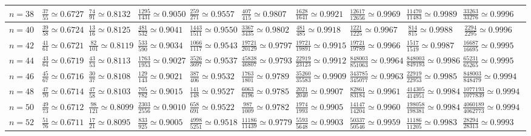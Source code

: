 \begin{landscape}
\begin{table}
\begin{tabular}{|c||c|c|c|c|c|c|c|c|c|c}
$n=38$ & $\frac{37}{55}\simeq0.6727$ & $\frac{74}{91}\simeq0.8132$ & $\frac{1295}{1431}\simeq0.9050$ & $\frac{259}{271}\simeq0.9557$ & $\frac{407}{415}\simeq0.9807$ & $\frac{1628}{1641}\simeq0.9921$ & $\frac{12617}{12656}\simeq0.9969$ & $\frac{11470}{11483}\simeq0.9989$ & $\frac{33263}{33276}\simeq0.9996$ \\ \hline
$n=40$ & $\frac{39}{58}\simeq0.6724$ & $\frac{13}{16}\simeq0.8125$ & $\frac{481}{532}\simeq0.9041$ & $\frac{1443}{1511}\simeq0.9550$ & $\frac{3367}{3435}\simeq0.9802$ & $\frac{481}{485}\simeq0.9918$ & $\frac{1221}{1225}\simeq0.9967$ & $\frac{814}{815}\simeq0.9988$ & $\frac{2294}{2295}\simeq0.9996$ \\ \hline
$n=42$ & $\frac{41}{61}\simeq0.6721$ & $\frac{82}{101}\simeq0.8119$ & $\frac{533}{590}\simeq0.9034$ & $\frac{1066}{1117}\simeq0.9543$ & $\frac{19721}{20129}\simeq0.9797$ & $\frac{19721}{19891}\simeq0.9915$ & $\frac{19721}{19789}\simeq0.9966$ & $\frac{1517}{1519}\simeq0.9987$ & $\frac{16687}{16695}\simeq0.9995$ \\ \hline
$n=44$ & $\frac{43}{64}\simeq0.6719$ & $\frac{43}{53}\simeq0.8113$ & $\frac{1763}{1953}\simeq0.9027$ & $\frac{3526}{3697}\simeq0.9537$ & $\frac{45838}{46807}\simeq0.9793$ & $\frac{22919}{23123}\simeq0.9912$ & $\frac{848003}{851063}\simeq0.9964$ & $\frac{848003}{849193}\simeq0.9986$ & $\frac{65231}{65265}\simeq0.9995$ \\ \hline
$n=46$ & $\frac{45}{67}\simeq0.6716$ & $\frac{30}{37}\simeq0.8108$ & $\frac{129}{143}\simeq0.9021$ & $\frac{387}{406}\simeq0.9532$ & $\frac{1763}{1801}\simeq0.9789$ & $\frac{35260}{35583}\simeq0.9909$ & $\frac{343785}{345077}\simeq0.9963$ & $\frac{22919}{22953}\simeq0.9985$ & $\frac{848003}{848479}\simeq0.9994$ \\ \hline
$n=48$ & $\frac{47}{70}\simeq0.6714$ & $\frac{47}{58}\simeq0.8103$ & $\frac{705}{782}\simeq0.9015$ & $\frac{141}{148}\simeq0.9527$ & $\frac{6063}{6196}\simeq0.9785$ & $\frac{2021}{2040}\simeq0.9907$ & $\frac{82861}{83184}\simeq0.9961$ & $\frac{414305}{414951}\simeq0.9984$ & $\frac{1077193}{1077839}\simeq0.9994$ \\ \hline
$n=50$ & $\frac{49}{73}\simeq0.6712$ & $\frac{98}{121}\simeq0.8099$ & $\frac{2303}{2556}\simeq0.9010$ & $\frac{658}{691}\simeq0.9522$ & $\frac{987}{1009}\simeq0.9782$ & $\frac{1974}{1993}\simeq0.9905$ & $\frac{14147}{14204}\simeq0.9960$ & $\frac{198058}{198381}\simeq0.9984$ & $\frac{4060189}{4062773}\simeq0.9994$ \\ \hline
$n=52$ & $\frac{51}{76}\simeq0.6711$ & $\frac{17}{21}\simeq0.8095$ & $\frac{833}{925}\simeq0.9005$ & $\frac{4998}{5251}\simeq0.9518$ & $\frac{11186}{11439}\simeq0.9779$ & $\frac{5593}{5648}\simeq0.9903$ & $\frac{50337}{50546}\simeq0.9959$ & $\frac{11186}{11205}\simeq0.9983$ & $\frac{28294}{28313}\simeq0.9993$ \\ \hline

\end{tabular}
\end{table}
\end{landscape}
